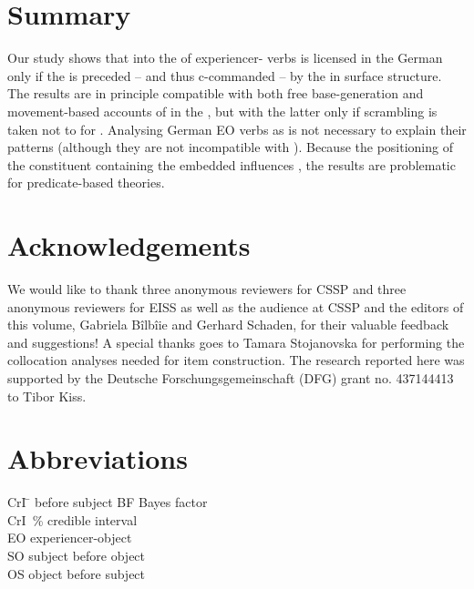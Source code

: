 \documentclass[output=paper,colorlinks,citecolor=brown]{langscibook}
\begin{document}
\section{Summary}
\label{sec:conclusion:Masloch}

Our study shows that   into the  of experiencer- verbs is licensed in the German  only if the  is preceded -- and thus c-commanded -- by the  in surface structure.    
The results are in principle compatible with both free base-generation and movement-based accounts of  in the , but with the latter only if scrambling is taken not to  for .
Analysing German EO verbs as  is not necessary to explain their   patterns (although they are not incompatible with ).
Because the positioning of the constituent containing the embedded  influences , the results are problematic for predicate-based  theories.

\section*{Acknowledgements}

We would like to thank three anonymous reviewers for CSSP and three anonymous reviewers for EISS as well as the audience at CSSP and the editors of this volume, Gabriela Bîlbîie and Gerhard Schaden, for their valuable feedback and suggestions!
A special thanks goes to Tamara Stojanovska for performing the collocation analyses needed for item construction.
The research reported here was supported by the Deutsche Forschungsgemeinschaft
(DFG) grant no. 437144413 to Tibor Kiss.

\newpage
\section*{Abbreviations}
\begin{multicols}{2}
\begin{tabbing}
  CrI \hspace{1em} \=  before subject\kill
  BF \> Bayes factor\\
  CrI \,\% credible interval\\
  EO \>  experiencer-object\\ 
  SO \>  subject before object\\
  OS \> object before subject\\
\end{tabbing}
\end{multicols}

\sloppy
\printbibliography[heading=subbibliography,notkeyword=this]
\end{document}
